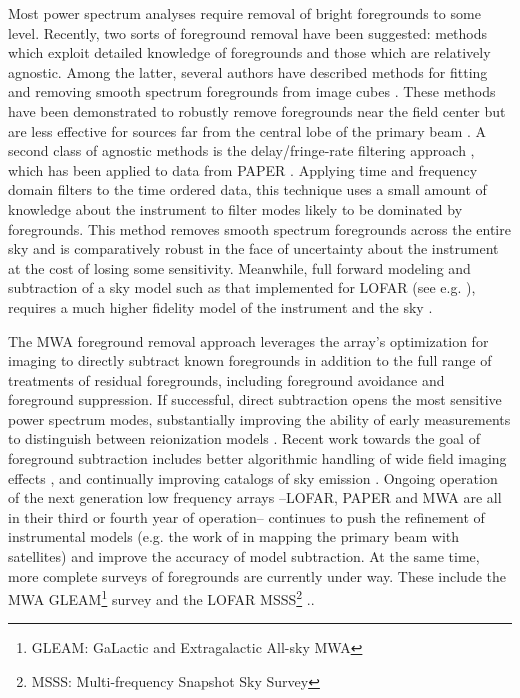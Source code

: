 \documentclass[twolcolumn]{emulateapj}
\begin{document}
Most power spectrum analyses require removal of bright foregrounds to some level.  Recently, two sorts of foreground removal have been suggested: methods which exploit detailed knowledge of foregrounds and those which are relatively agnostic. Among the latter, several authors have described methods for fitting and removing smooth spectrum foregrounds from image cubes  \cite{Morales:2006p1903,Bowman:2009p7816,Liu:2009p4762,Liu:2011p8763,Chapman:2013p10379,Dillon:2013p10497,Yatawatta:2013p9699}. These methods have been demonstrated to robustly remove foregrounds near the field center but are less effective for sources far from the central lobe of the primary beam \citep[][Pober et al, in press]{2015ApJ...804...14T,2015ApJ...807L..28T}.  A second class of agnostic methods is the delay/fringe-rate filtering approach \citep{Parsons:2012p8896,2014PhRvD..90b3018L,2014PhRvD..90b3019L}, which has been applied to data from PAPER \citep{Parsons:2014p10499,	2015ApJ...809...61A,2015ApJ...801...51J}.  Applying time and frequency domain filters to the time ordered data, this technique uses a small amount of knowledge about the instrument to filter modes likely to be dominated by foregrounds.  This method removes smooth spectrum foregrounds across the entire sky and is comparatively robust in the face of uncertainty about the instrument at the cost of losing some sensitivity.  Meanwhile, full forward modeling and subtraction of a sky model such as that implemented for LOFAR (see e.g. \cite{Jelic:2008p2130,Yatawatta:2013p9699}), requires a much higher fidelity model of the instrument and the sky \citep{Datta:2010p8781,Vedantham:2012p10297}.


The MWA foreground removal approach leverages the array's optimization for imaging to directly subtract known foregrounds in addition to the full range of treatments of residual foregrounds, including foreground avoidance and foreground suppression.  If successful, direct subtraction opens the most sensitive power spectrum modes, substantially improving the ability of early measurements to distinguish between reionization models \citep{Beardsley:2013p9952,Pober:2014p10390}. Recent work towards the goal of foreground subtraction includes better algorithmic handling of wide field imaging effects \citep{Tasse:2012p9459,Bhatnagar..2013ApJ,Sullivan:2012p9457,Ord:2010p8442,2014MNRAS.444..606O}, and continually improving catalogs of sky emission \citep{deOliveiraCosta:2008p2242,Jacobs:2011p8438,2013ApJ...776..108J,Hurley-walker:2014p45}. Ongoing operation of the next generation low frequency arrays --LOFAR, PAPER and MWA are all in their  third or fourth year of operation-- continues to push the refinement of instrumental models (e.g. the work of \cite{2015RaSc...50..614N} in mapping the primary beam with satellites) and improve the accuracy of model subtraction.  At the same time, more complete surveys of foregrounds are currently under way. These include the MWA GLEAM\footnote{GLEAM: GaLactic and Extragalactic All-sky MWA} survey \citep{2015PASA...32...25W}  and the LOFAR MSSS\footnote{MSSS: Multi-frequency Snapshot Sky Survey} \citep{2015A&A...582A.123H}..   
\end{document}
